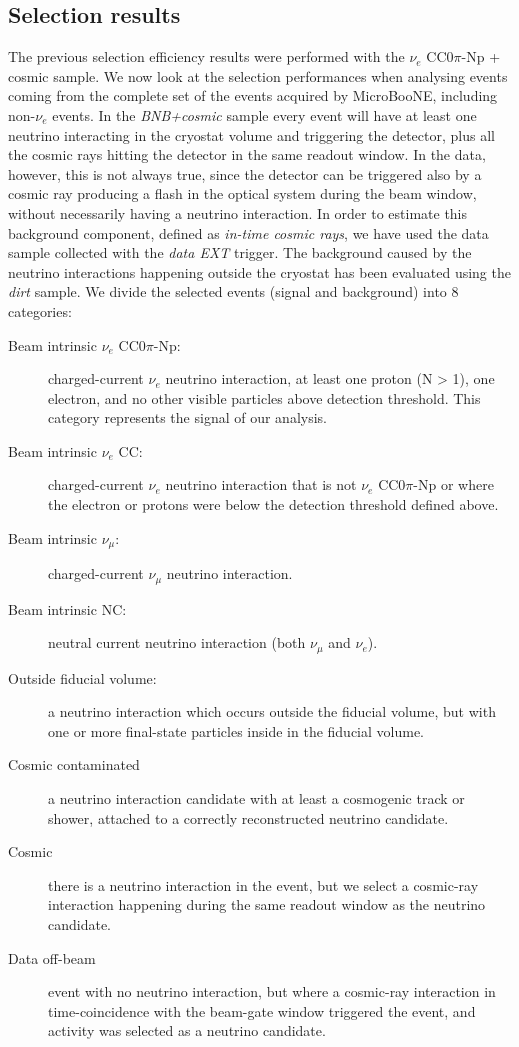 \subsection{Selection results}\label{sec:numu}
The previous selection efficiency results were performed with the $\nu_{e}$ CC0$\pi$-Np + cosmic sample. We now look at the selection performances when analysing events coming from the complete set of the events acquired by MicroBooNE, including non-$\nu_{e}$ events. In the \emph{BNB+cosmic} sample every event will have at least one neutrino interacting in the cryostat volume and triggering the detector, plus all the cosmic rays hitting the detector in the same readout window. In the data, however, this is not always true, since the detector can be triggered also by a cosmic ray producing a flash in the optical system during the beam window, without necessarily having a neutrino interaction. In order to estimate this background component, defined as \emph{in-time cosmic rays}, we have used the data sample collected with the \emph{data EXT} trigger.
The background caused by the neutrino interactions happening outside the cryostat has been evaluated using the \emph{dirt} sample.
We divide the selected events (signal and background) into 8 categories:
\begin{description}
\item[Beam intrinsic $\nu_{e}$ CC$0\pi$-Np:] charged-current $\nu_{e}$ neutrino interaction, at least one proton (N > 1), one electron, and no other visible particles above detection threshold. This category represents the signal of our analysis.
\item[Beam intrinsic $\nu_{e}$ CC:] charged-current $\nu_{e}$ neutrino interaction that is not $\nu_{e}$ CC$0\pi$-Np or where the electron or protons were below the detection threshold defined above.
\item[Beam intrinsic $\nu_{\mu}$:] charged-current $\nu_{\mu}$ neutrino interaction.
\item[Beam intrinsic NC:] neutral current neutrino interaction (both $\nu_{\mu}$ and $\nu_{e}$).
\item[Outside fiducial volume:] a neutrino interaction which occurs outside the fiducial volume, but with one or more final-state particles inside in the fiducial volume.
\item[Cosmic contaminated] a neutrino interaction candidate with at least a cosmogenic track or shower, attached to a correctly reconstructed neutrino candidate.
\item[Cosmic] there is a neutrino interaction in the event, but we select a cosmic-ray interaction happening during the same readout window as the neutrino candidate.
\item[Data off-beam] {event with no neutrino interaction, but where a cosmic-ray interaction in time-coincidence with the beam-gate window triggered the event, and activity was selected as a neutrino candidate.}
\end{description}

